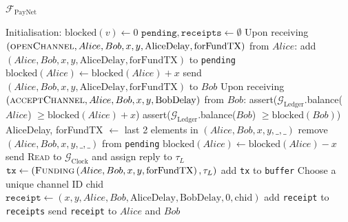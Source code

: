 \begin{functionality}{$\mathcal{F}_{\mathrm{PayNet}}$}
  \label{alg:payfunc}
  \begin{algorithmic}[1]
    \State Initialisation:
      \Indent
        \State $\mathrm{blocked}\left(v\right) \gets 0$
      \EndFor
      \State $\mathtt{pending}, \mathtt{receipts} \gets \emptyset$
      \EndIndent
    \State
    \State Upon receiving $\left(\textsc{openChannel}, Alice, Bob, x, y,
    \mathrm{AliceDelay}, \mathrm{forFundTX}\right)$ from $Alice$:
    \Indent
        \State add $\left(Alice, Bob, x, y, \mathrm{AliceDelay},
        \mathrm{forFundTX}\right)$ to \texttt{pending}
        \State $\mathrm{blocked}\left(Alice\right) \leftarrow
        \mathrm{blocked}\left(Alice\right) + x$
        \State send $\left(Alice, Bob, x, y, \mathrm{AliceDelay},
        \mathrm{forFundTX}\right)$ to $Bob$ 
      \EndIf
    \EndIndent
    \State
    \State Upon receiving $\left(\textsc{acceptChannel}, Alice, Bob, x, y,
    \mathrm{BobDelay}\right)$ from $Bob$:
    \Indent
        \State assert($\mathcal{G}_{\mathrm{Ledger}}$.balance($Alice$) $\geq
        \mathrm{blocked}\left(Alice\right) + x$)
        \State assert($\mathcal{G}_{\mathrm{Ledger}}$.balance($Bob$) $\geq
        \mathrm{blocked}\left(Bob\right)$)
        \State AliceDelay, forFundTX $\gets$ last 2 elements in $\left(Alice,
        Bob, x, y, \_, \_\right)$
        \State remove $\left(Alice, Bob, x, y, \_, \_\right)$ from
        \texttt{pending}
        \State $\mathrm{blocked}\left(Alice\right) \gets
        \mathrm{blocked}\left(Alice\right) - x$
        \State send \textsc{Read} to $\mathcal{G}_{\mathrm{Clock}}$ and assign
        reply to $\tau_L$
        \State $\mathtt{tx} \gets \left(\textsc{Funding}\left(Alice, Bob, x, y,
        \mathrm{forFundTX}\right), \tau_L\right)$
        \State add \texttt{tx} to \texttt{buffer}
        \State Choose a unique channel ID chid
        \State $\mathtt{receipt} \gets \left(x, y, Alice, Bob,
        \mathrm{AliceDelay}, \mathrm{BobDelay}, 0, \mathrm{chid}\right)$
        \State add \texttt{receipt} to \texttt{receipts}
        \State send \texttt{receipt} to $Alice$ and $Bob$

\end{algorithmic}
\end{functionality}
